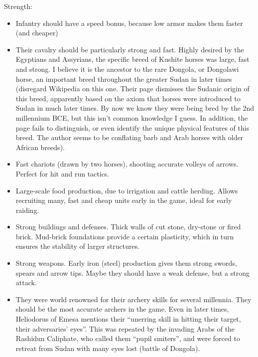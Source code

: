 \documentclass[a4paper,12pt]{scrreprt}
\begin{document}
Strength:

\begin{itemize}
	\item Infantry should have a speed bonus, because low armor makes them faster (and cheaper)

	\item Their cavalry should be particularly strong and fast. Highly desired by the Egyptians and Assyrians, the specific breed of Kushite horses was large, fast and strong. I believe it is the ancestor to the rare Dongola, or Dongolawi horse, an important breed throughout the greater Sudan in later times (disregard Wikipedia on this one. Their page dismisses the Sudanic origin of this breed, apparently based on the axiom that horses were introduced to Sudan in much later times. By now we know they were being bred by the 2nd millennium BCE, but this isn’t common knowledge I guess. In addition, the page fails to distinguish, or even identify the unique physical features of this breed. The author seems to be conflating barb and Arab horses with older African breeds).

	\item Fast chariots (drawn by two horses), shooting accurate volleys of arrows. Perfect for hit and run tactics.

	\item Large-scale food production, due to irrigation and cattle herding. Allows recruiting many, fast and cheap units early in the game, ideal for early raiding.

	\item Strong buildings and defenses. Thick walls of cut stone, dry-stone or fired brick. Mud-brick foundations provide a certain plasticity, which in turn ensures the stability of larger structures.

	\item Strong weapons. Early iron (steel) production gives them strong swords, spears and arrow tips. Maybe they should have a weak defense, but a strong attack.

	\item They were world renowned for their archery skills for several millennia. They should be the most accurate archers in the game. Even in later times, Heliodorus of Emesa mentions their “unerring skill in hitting their target, their adversaries’ eyes”. This was repeated by the invading Arabs of the Rashidun Caliphate, who called them “pupil smiters”, and were forced to retreat from Sudan with many eyes lost (battle of Dongola).  
\end{itemize}
\end{document}
